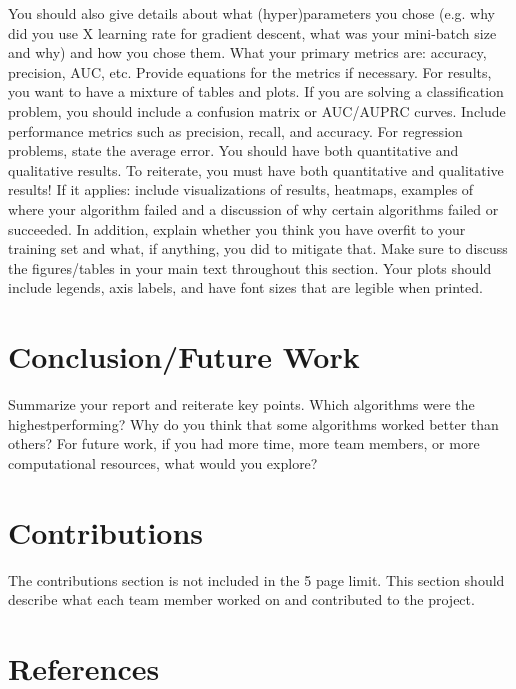\documentclass{article}
\begin{document}
You should also give details about what (hyper)parameters you chose (e.g. why did you
use X learning rate for gradient descent, what was your mini-batch size and why) and how
you chose them. What your primary metrics are: accuracy, precision,
AUC, etc. Provide equations for the metrics if necessary. For results, you want to have a
mixture of tables and plots. If you are solving a classification problem, you should include a
confusion matrix or AUC/AUPRC curves. Include performance metrics such as precision,
recall, and accuracy. For regression problems, state the average error. You should have
both quantitative and qualitative results. To reiterate, you must have both quantitative
and qualitative results! If it applies: include visualizations of results, heatmaps,
examples of where your algorithm failed and a discussion of why certain algorithms failed
or succeeded. In addition, explain whether you think you have overfit to your training set
and what, if anything, you did to mitigate that. Make sure to discuss the figures/tables in
your main text throughout this section. Your plots should include legends, axis labels, and
have font sizes that are legible when printed.



\section{Conclusion/Future Work }
Summarize your report and reiterate key points. Which algorithms were the highestperforming?
Why do you think that some algorithms worked better than others? For
future work, if you had more time, more team members, or more computational resources,
what would you explore?



\section{Contributions}
The contributions section is not included in the 5 page limit. This section should describe
what each team member worked on and contributed to the project.



\section*{References}
\end{document}
